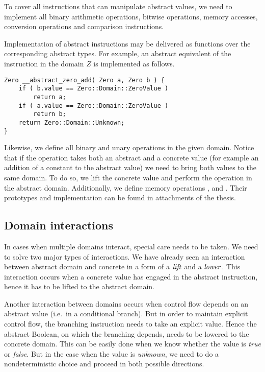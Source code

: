 To cover all \LLVM instructions that can manipulate abstract values, we need to
implement all binary arithmetic operations, bitwise operations, memory
accesses, conversion operations and comparison instructions.

Implementation of abstract instructions may be delivered as \Cpp{} functions over
the corresponding abstract types. For example, an abstract equivalent of the
 instruction in the domain $Z$ is implemented as
follows.

\begin{verbatim}
Zero __abstract_zero_add( Zero a, Zero b ) {
    if ( b.value == Zero::Domain::ZeroValue )
        return a;
    if ( a.value == Zero::Domain::ZeroValue )
        return b;
    return Zero::Domain::Unknown;
}
\end{verbatim}

Likewise, we define all binary and unary operations in the given domain. Notice
that if the operation takes both an abstract and a concrete value (for example an
addition of a constant to the abstract value) we need to bring both values to the same
domain. To do so, we lift the concrete value and perform the operation in the
abstract domain. Additionally, we define memory operations ,
 and . Their prototypes and implementation can be found
in attachments of the thesis.

\subsection{Domain interactions} \label{sec:interactions}
In cases when multiple domains interact, special care needs to be
taken. We need to solve two major types of interactions.
We have already seen an interaction between abstract domain and concrete in a
form of a $\mathit{lift}$ and a $\mathit{lower}$. This interaction occurs when a concrete value
has engaged in the abstract instruction, hence it has to be lifted to the
abstract domain.

Another interaction between domains occurs when control flow depends on an
abstract value (i.e.~in a conditional branch).  But in order to maintain
explicit control flow, the branching instruction needs to take an explicit
value. Hence the abstract Boolean, on which the branching depends, needs to be
lowered to the concrete domain. This can be easily done when we know whether the
value is \emph{true} or \emph{false}. But in the case when the value is
\emph{unknown}, we need to do a nondeterministic choice and proceed in both
possible directions.

